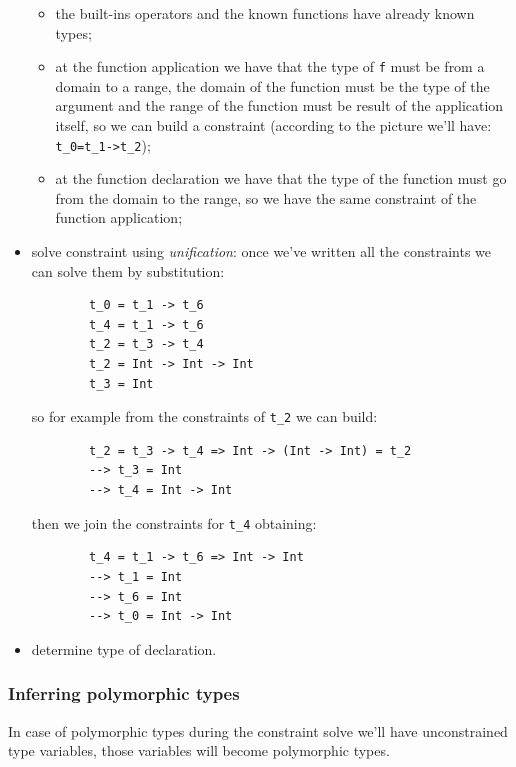 \begin{itemize}
\begin{itemize}
        \item the built-ins operators and the known functions have already known types;

        \item at the function application we have that the type of \verb|f| must be from a domain to a range, the domain of the function must be the type of the argument and the range of the function must be result of the application itself, so we can build a constraint (according to the picture we'll have: \verb|t_0=t_1->t_2|);

        \item at the function declaration we have that the type of the function must go from the domain to the range, so we have the same constraint of the function application;
    \end{itemize}

    \item solve constraint using \emph{unification}: once we've written all the constraints we can solve them by substitution:
    \begin{verbatim}
        t_0 = t_1 -> t_6
        t_4 = t_1 -> t_6
        t_2 = t_3 -> t_4
        t_2 = Int -> Int -> Int
        t_3 = Int
    \end{verbatim}
    so for example from the constraints of \verb|t_2| we can build:
    \begin{verbatim}
        t_2 = t_3 -> t_4 => Int -> (Int -> Int) = t_2
        --> t_3 = Int
        --> t_4 = Int -> Int
    \end{verbatim}
    then we join the constraints for \verb|t_4| obtaining:
    \begin{verbatim}
        t_4 = t_1 -> t_6 => Int -> Int
        --> t_1 = Int
        --> t_6 = Int
        --> t_0 = Int -> Int
    \end{verbatim}

    \item determine type of declaration.    
\end{itemize}

\subsubsection{Inferring polymorphic types}
In case of polymorphic types during the constraint solve we'll have unconstrained type variables, those variables will become polymorphic types.

